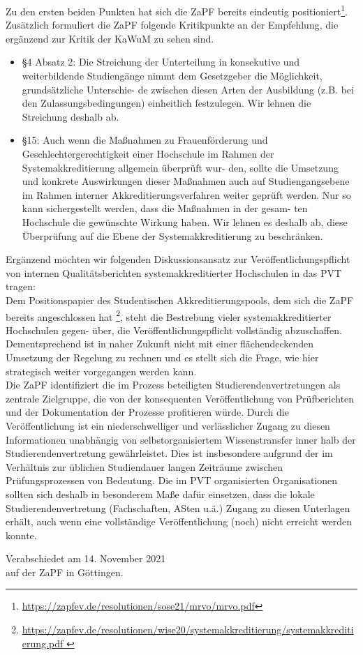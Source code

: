 \documentclass[DIV=calc]{scrartcl}
\begin{document}
Zu den ersten beiden Punkten hat sich die ZaPF bereits eindeutig positioniert\footnote{\url{https://zapfev.de/resolutionen/sose21/mrvo/mrvo.pdf}}.
Zusätzlich formuliert die ZaPF folgende Kritikpunkte an der Empfehlung, die ergänzend zur Kritik der KaWuM zu sehen sind.
\begin{itemize}
\item §4 Absatz 2: Die Streichung der Unterteilung in konsekutive und weiterbildende Studiengänge nimmt dem Gesetzgeber die Möglichkeit, grundsätzliche Unterschie- de zwischen diesen Arten der Ausbildung (z.B. bei den Zulassungsbedingungen) einheitlich festzulegen. Wir lehnen die Streichung deshalb ab.
\item §15: Auch wenn die Maßnahmen zu Frauenförderung und Geschlechtergerechtigkeit einer Hochschule im Rahmen der Systemakkreditierung allgemein überprüft wur- den, sollte die Umsetzung und konkrete Auswirkungen dieser Maßnahmen auch auf Studiengangsebene im Rahmen interner Akkreditierungsverfahren weiter geprüft werden. Nur so kann sichergestellt werden, dass die Maßnahmen in der gesam- ten Hochschule die gewünschte Wirkung haben. Wir lehnen es deshalb ab, diese Überprüfung auf die Ebene der Systemakkreditierung zu beschränken.
\end{itemize}
\vspace{9mm}
Ergänzend möchten wir folgenden Diskussionsansatz zur Veröffentlichungspflicht von internen Qualitätsberichten systemakkreditierter Hochschulen in das PVT tragen:\\
Dem Positionspapier des Studentischen Akkreditierungspools, dem sich die ZaPF bereits angeschlossen hat \footnote{\url{https://zapfev.de/resolutionen/wise20/systemakkreditierung/systemakkreditierung.pdf
}}, steht die Bestrebung vieler systemakkreditierter Hochschulen gegen- über, die Veröffentlichungspflicht vollständig abzuschaffen. Dementsprechend ist in naher Zukunft nicht mit einer flächendeckenden Umsetzung der Regelung zu rechnen und es stellt sich die Frage, wie hier strategisch weiter vorgegangen werden kann.\\
Die ZaPF identifiziert die im Prozess beteiligten Studierendenvertretungen als zentrale Zielgruppe, die von der konsequenten Veröffentlichung von Prüfberichten und der Dokumentation der Prozesse profitieren würde. Durch die Veröffentlichung ist ein niederschwelliger und verlässlicher Zugang zu diesen Informationen unabhängig von selbstorganisiertem Wissenstransfer inner halb der Studierendenvertretung gewährleistet. Dies ist insbesondere aufgrund der im Verhältnis zur üblichen Studiendauer langen Zeiträume zwischen Prüfungsprozessen von Bedeutung. Die im PVT organisierten Organisationen sollten sich deshalb in besonderem Maße dafür einsetzen, dass die lokale Studierendenvertretung (Fachschaften, ASten u.ä.) Zugang zu diesen Unterlagen erhält, auch wenn eine vollständige Veröffentlichung (noch) nicht erreicht werden konnte.



\vfill
\begin{flushright}
	Verabschiedet am 14. November 2021 \\
	auf der ZaPF in Göttingen.
\end{flushright}
\end{document}
